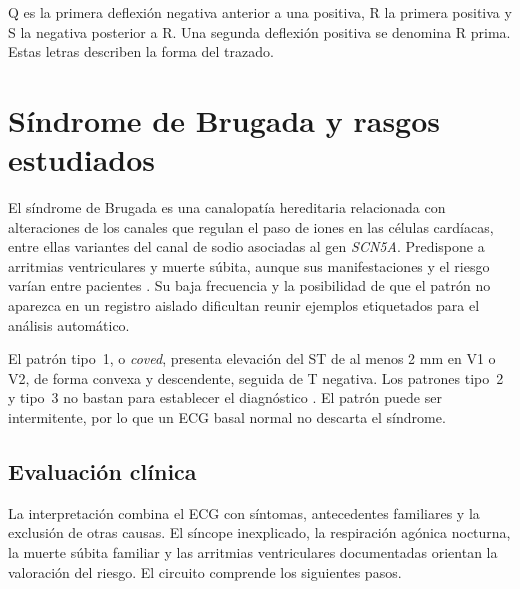 Q es la primera deflexión negativa anterior a una positiva, R la primera positiva y S la negativa posterior a R. Una segunda deflexión positiva se denomina R prima. Estas letras describen la forma del trazado.

\section{Síndrome de Brugada y rasgos estudiados}
\label{sec:brugada_clinica}

El síndrome de Brugada es una canalopatía hereditaria relacionada con alteraciones de los canales que regulan el paso de iones en las células cardíacas, entre ellas variantes del canal de sodio asociadas al gen \emph{SCN5A}. Predispone a arritmias ventriculares y muerte súbita, aunque sus manifestaciones y el riesgo varían entre pacientes \cite{zeppenfeld2022,wilde2023scbt}. Su baja frecuencia y la posibilidad de que el patrón no aparezca en un registro aislado dificultan reunir ejemplos etiquetados para el análisis automático.

El patrón tipo~1, o \emph{coved}, presenta elevación del ST de al menos 2 mm en V1 o V2, de forma convexa y descendente, seguida de T negativa. Los patrones tipo~2 y tipo~3 no bastan para establecer el diagnóstico \cite{zeppenfeld2022}. El patrón puede ser intermitente, por lo que un ECG basal normal no descarta el síndrome.

\subsection{Evaluación clínica}
\label{sec:evaluacion_clinica}

La interpretación combina el ECG con síntomas, antecedentes familiares y la exclusión de otras causas. El síncope inexplicado, la respiración agónica nocturna, la muerte súbita familiar y las arritmias ventriculares documentadas orientan la valoración del riesgo. El circuito comprende los siguientes pasos.

